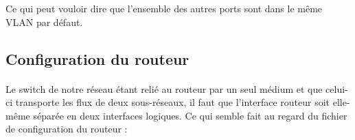 \documentclass[a4paper,12pt]{article}
\begin{document}
\begin{center}
 \end{center}
 
Ce qui peut vouloir dire que l'ensemble des autres ports sont dans le même VLAN par défaut.

\subsection{Configuration du routeur}
\paragraph{}Le switch de notre réseau étant relié au routeur par un seul médium et que celui-ci transporte les flux de deux sous-réseaux, il faut que l'interface routeur soit elle-même séparée en deux interfaces logiques. Ce qui semble fait au regard du fichier de configuration du routeur :


\begin{center}
 \end{center}
\end{document}
